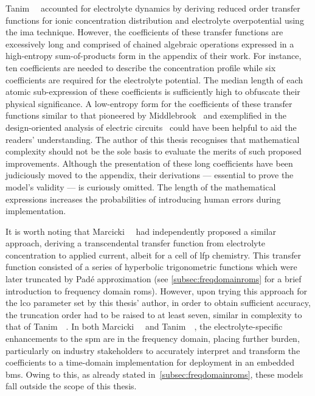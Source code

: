 Tanim~\etal~\cite{Tanim2014}  accounted  for  electrolyte dynamics  by  deriving
reduced   order  transfer   functions  for   ionic  concentration   distribution
and   electrolyte  overpotential   using  the   \gls{ima}  technique.   However,
the  coefficients  of   these  transfer  functions  are   excessively  long  and
comprised  of   chained  algebraic   operations  expressed  in   a  high-entropy
sum-of-products  form  in  the  appendix   of  their  work.  For  instance,  ten
coefficients  are  needed  to  describe  the  concentration  profile  while  six
coefficients  are required  for  the electrolyte  potential.  The median  length
of  each  atomic  sub-expression  of these  coefficients  is  sufficiently  high
to  obfuscate   their  physical  significance.   A  low-entropy  form   for  the
coefficients  of  these   transfer  functions  similar  to   that  pioneered  by
Middlebrook~\cite{Middlebrook} and  exemplified in the  design-oriented analysis
of  electric   circuits~\cite{Middlebrook1998,Vorperian2002}  could   have  been
helpful to aid the readers' understanding.  The author of this thesis recognises
that  mathematical complexity  should  not be  the sole  basis  to evaluate  the
merits of  such proposed improvements.  Although the presentation of  these long
coefficients have been judiciously moved  to the appendix, their derivations ---
essential to prove the model's validity  --- is curiously omitted. The length of
the mathematical  expressions increases  the probabilities of  introducing human
errors during implementation.

It  is worth  noting that  Marcicki~\etal~\cite{Marcicki2013} had  independently
proposed a similar approach, \viz{}  deriving a transcendental transfer function
from  electrolyte  concentration  to  applied  current, albeit  for  a  cell  of
\gls{lfp} chemistry. This transfer function  consisted of a series of hyperbolic
trigonometric functions which  were later truncated by  Padé approximation (see
\cref{subsec:freqdomainroms}  for  a  brief  introduction  to  frequency  domain
\glspl{rom}). However, upon trying this approach for the \gls{lco} parameter set
by this thesis'  author, in order to obtain sufficient  accuracy, the truncation
order had  to be  raised to  at least seven,  similar in  complexity to  that of
Tanim~\etal~\cite{Tanim2014a}.  In  both Marcicki~\etal~\cite{Marcicki2013}  and
Tanim~\etal~\cite{Tanim2014a},  the  electrolyte-specific  enhancements  to  the
\gls{spm} are in  the frequency domain, placing further  burden, particularly on
industry stakeholders to accurately interpret  and transform the coefficients to
a time-domain implementation  for deployment in an embedded  \gls{bms}. Owing to
this,  as  already  stated in~\cref{subsec:freqdomainroms},  these  models  fall
outside the scope of this thesis.

